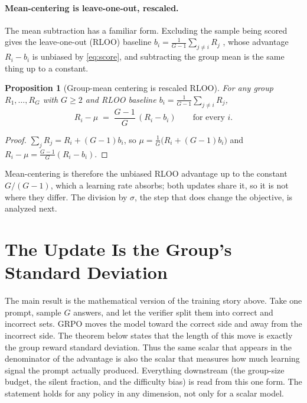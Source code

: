 \documentclass[11pt]{article}
\theoremstyle{plain}
\newtheorem{proposition}{Proposition}
\theoremstyle{definition}
\begin{document}
\paragraph{Mean-centering is leave-one-out, rescaled.} The mean subtraction has a familiar form. Excluding the sample being scored gives the leave-one-out (RLOO) baseline $b_i=\frac{1}{G-1}\sum_{j\ne i}R_j$ \citep{ahmadian2024rloo,kool2019buy}, whose advantage $R_i-b_i$ is unbiased by \eqref{eq:score}, and subtracting the group mean is the same thing up to a constant.
\begin{proposition}[Group-mean centering is rescaled RLOO]
\label{prop:loo}
For any group $R_1,\dots,R_G$ with $G\ge2$ and RLOO baseline $b_i=\frac{1}{G-1}\sum_{j\ne i}R_j$,
\[
R_i-\mu \;=\; \frac{G-1}{G}\,(R_i-b_i)\qquad\text{for every }i.
\]
\end{proposition}
\begin{proof}
$\sum_j R_j=R_i+(G-1)b_i$, so $\mu=\tfrac1G\big(R_i+(G-1)b_i\big)$ and $R_i-\mu=\tfrac{G-1}{G}(R_i-b_i)$.
\end{proof}
Mean-centering is therefore the unbiased RLOO advantage up to the constant $G/(G-1)$, which a learning rate absorbs; both updates share it, so it is not where they differ. The division by $\sigma$, the step that does change the objective, is analyzed next.

\section{The Update Is the Group's Standard Deviation}
\label{sec:finiteG}

The main result is the mathematical version of the training story above. Take one prompt, sample $G$ answers, and let the verifier split them into correct and incorrect sets. GRPO moves the model toward the correct side and away from the incorrect side. The theorem below states that the length of this move is exactly the group reward standard deviation. Thus the same scalar that appears in the denominator of the advantage is also the scalar that measures how much learning signal the prompt actually produced. Everything downstream (the group-size budget, the silent fraction, and the difficulty bias) is read from this one form. The statement holds for any policy in any dimension, not only for a scalar model.
\end{document}
